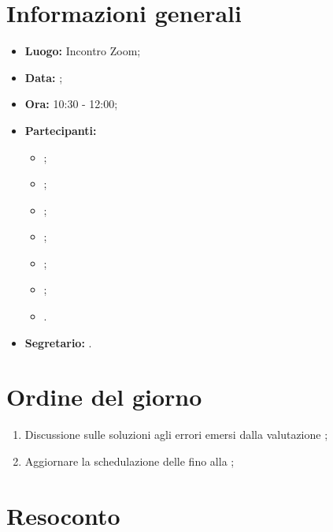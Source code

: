 \section{Informazioni generali}
\begin{itemize}
	\item \textbf{Luogo:} Incontro Zoom;
	\item \textbf{Data:} \Data;
	\item \textbf{Ora:} 10:30 - 12:00;
	\item \textbf{Partecipanti:}
	\begin{itemize}
		\item \BL{}; 
		\item \FF{};
		\item \MM{}; 
		\item \PC{};
		\item \TG{};
		\item \TL{};
		\item \VD{}.
	\end{itemize} 
	\item \textbf{Segretario:} \FF{}.
\end{itemize}

\section{Ordine del giorno}
\begin{enumerate}
	 \item Discussione sulle soluzioni agli errori emersi dalla valutazione ;
	\item Aggiornare la schedulazione delle  fino alla ;
\end{enumerate}

\section{Resoconto}
